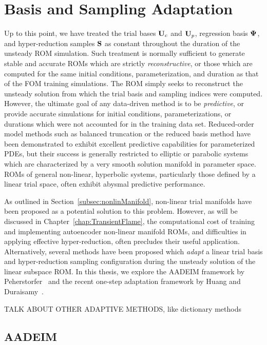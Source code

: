 \section{Basis and Sampling Adaptation}\label{sec:adaptation}

Up to this point, we have treated the trial bases $\consTrial$ and $\primTrial$, regression basis $\deimBasis$, and hyper-reduction samples $\mathbf{S}$ as constant throughout the duration of the unsteady ROM simulation. Such treatment is normally sufficient to generate stable and accurate ROMs which are strictly \textit{reconstructive}, or those which are computed for the same initial conditions, parameterization, and duration as that of the FOM training simulations. The ROM simply seeks to reconstruct the unsteady solution from which the trial basis and sampling indices were computed. However, the ultimate goal of any data-driven method is to be \textit{predictive}, or provide accurate simulations for initial conditions, parameterizations, or durations which were not accounted for in the training data set. Reduced-order model methods such as balanced truncation or the reduced basis method have been demonstrated to exhibit excellent predictive capabilities for parameterized PDEs, but their success is generally restricted to elliptic or parabolic systems which are characterized by a very smooth solution manifold in parameter space. ROMs of general non-linear, hyperbolic systems, particularly those defined by a linear trial space, often exhibit abysmal predictive performance.

As outlined in Section~\ref{subsec:nonlinManifold}, non-linear trial manifolds have been proposed as a potential solution to this problem. However, as will be discussed in Chapter~\ref{chap:TransientFlame}, the computational cost of training and implementing autoencoder non-linear manifold ROMs, and difficulties in applying effective hyper-reduction, often precludes their useful application. Alternatively, several methods have been proposed which \textit{adapt} a linear trial basis and hyper-reduction sampling configuration during the unsteady solution of the linear subspace ROM. In this thesis, we explore the AADEIM framework by Peherstorfer~\cite{Peherstorfer2015} and the recent one-step adaptation framework by Huang and Duraisamy~\cite{1}.

{\color{red}TALK ABOUT OTHER ADAPTIVE METHODS, like dictionary methods}

\subsection{AADEIM}

